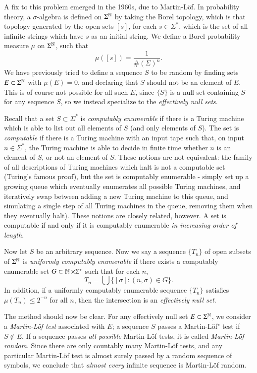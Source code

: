 A fix to this problem emerged in the 1960s, due to Martin-L\"{o}f. In probability theory, a $\sigma$-algebra is defined on $\Sigma^{\operatorname{\mathbb{N}}}$ by taking the Borel topology, which is that topology generated by the open sets $[s]$, for each $s \in \Sigma^*$, which is the set of all infinite strings which have $s$ as an initial string. We define a Borel probability measure $\mu$ on $\Sigma^{\operatorname{\mathbb{N}}}$, such that
%
\[ \mu([s]) = \frac{1}{\#(\Sigma)^n}. \]
%
We have previously tried to define a sequence $S$ to be random by finding sets $E \subset \Sigma^{\operatorname{\mathbb{N}}}$ with $\mu(E) = 0$, and declaring that $S$ should not be an element of $E$. This is of course not possible for all such $E$, since $\{ S \}$ is a null set containing $S$ for any sequence $S$, so we instead specialize to the \emph{effectively null sets}.

Recall that a set $S \subset \Sigma^*$ is \emph{computably enumerable} if there is a Turing machine which is able to list out all elements of $S$ (and only elements of $S$). The set is \emph{computable} if there is a Turing machine with an input tape such that, on input $n \in \Sigma^*$, the Turing machine is able to decide in finite time whether $n$ is an element of $S$, or not an element of $S$. These notions are not equivalent: the family of all descriptions of Turing machines which halt is not a computable set (Turing's famous proof), but the set is computably enumerable - simply set up a growing queue which eventually enumerates all possible Turing machines, and iteratively swap between adding a new Turing machine to this queue, and simulating a single step of all Turing machines in the queue, removing them when they eventually halt). These notions are closely related, however. A set is computable if and only if it is computably enumerable \emph{in increasing order of length}.

Now let $S$ be an arbitrary sequence. Now we say a sequence $\{ T_n \}$ of open subsets of $\Sigma^{\operatorname{\mathbb{N}}}$ is \emph{uniformly computably enumerable} if there exists a computably enumerable set $G \subset \operatorname{\mathbb{N}} \times \Sigma^*$ such that for each $n$,
%
\[ T_n = \bigcup \{ [\sigma] : (n,\sigma) \in G \}. \]
In addition, if a uniformly computably enumerable sequence $\{ T_n \}$ satisfies $\mu(T_n) \leq 2^{-n}$ for all $n$, then the intersection is an \emph{effectively null set}.

The method should now be clear. For any effectively null set $E \subset \Sigma^{\operatorname{\mathbb{N}}}$, we consider a \emph{Martin-L\"{o}f test} associated with $E$; a sequence $S$ passes a Martin-L\"{o}f" test if $S \not \in E$. If a sequence passes \emph{all possible} Martin-L\"{o}f tests, it is called \emph{Martin-L\"{o}f random}. Since there are only countably many Martin-L\"{o}f tests, and any particular Martin-L\"{o}f test is almost surely passed by a random sequence of symbols, we conclude that \emph{almost every} infinite sequence is Martin-L\"{o}f random.

